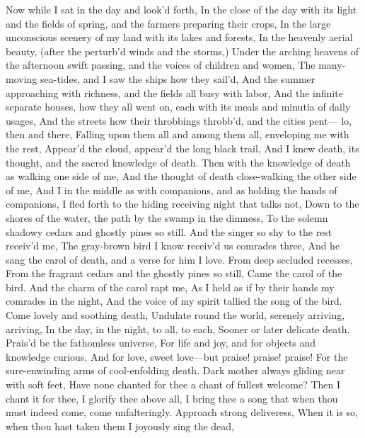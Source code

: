 \documentclass[11pt]{book}
\newenvironment {poem} [1]
 {\titulus{#1}%
  \versus
  \Nstanza{0}%
  \numerus{1}}
 {\endversus}
\begin{document}
\begin{poem}{When Lilacs Last in the Dooryard Bloom'd}
\stropha %

Now while I sat in the day and look'd forth,
In the close of the day with its light and the fields of spring, and %
    the farmers preparing their crops,
In the large unconscious scenery of my land with its lakes and forests,
In the heavenly aerial beauty, (after the perturb'd winds and the storms,)
Under the arching heavens of the afternoon swift passing, and the %
    voices of children and women,
The many-moving sea-tides, and I saw the ships how they sail'd,
And the summer approaching with richness, and the fields all busy %
    with labor,
And the infinite separate houses, how they all went on, each with %
    its meals and minutia of daily usages,
And the streets how their throbbings throbb'd, and the cities pent--- %
    lo, then and there,
Falling upon them all and among them all, enveloping me with the rest,
Appear'd the cloud, appear'd the long black trail,
And I knew death, its thought, and the sacred knowledge of death.
     \vacua
Then with the knowledge of death as walking one side of me,
And the thought of death close-walking the other side of me,
And I in the middle as with companions, and as holding the hands of %
    companions,
I fled forth to the hiding receiving night that talks not,
Down to the shores of the water, the path by the swamp in the dimness,
To the solemn shadowy cedars and ghostly pines so still.
     \vacua
And the singer so shy to the rest receiv'd me,
The gray-brown bird I know receiv'd us comrades three,
And he sang the carol of death, and a verse for him I love.
     \vacua
From deep secluded recesses,
From the fragrant cedars and the ghostly pines so still,
Came the carol of the bird.
     \vacua
And the charm of the carol rapt me,
As I held as if by their hands my comrades in the night,
And the voice of my spirit tallied the song of the bird.
     \vacua
{\Facies* \textus {\itshape}
Come lovely and soothing death,
Undulate round the world, serenely arriving, arriving,
In the day, in the night, to all, to each,
Sooner or later delicate death.
     \vacua
Prais'd be the fathomless universe,
For life and joy, and for objects and knowledge curious,
And for love, sweet love---but praise! praise! praise!
For the sure-enwinding arms of cool-enfolding death.
     \vacua
Dark mother always gliding near with soft feet,
Have none chanted for thee a chant of fullest welcome?
Then I chant it for thee, I glorify thee above all,
I bring thee a song that when thou must indeed come, come unfalteringly.
     \vacua
Approach strong deliveress,
When it is so, when thou hast taken them I joyously sing the dead,
}
\end{poem}
\end{document}
